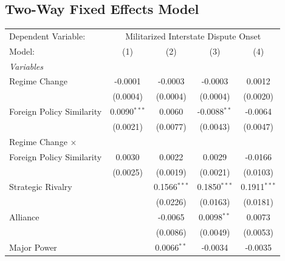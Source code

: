 \documentclass[12pt,a4paper]{article}
\begin{document}
\subsection{Two-Way Fixed Effects Model}
\begin{table}[hptb]
    \centering
\begin{tabular}{lcccc}
   \tabularnewline \midrule \midrule
   Dependent Variable: & \multicolumn{4}{c}{Militarized Interstate Dispute Onset}\\
   Model:                                & (1)            & (2)                     & (3)                            & (4)\\  
   \midrule
   \emph{Variables}\\
   Regime Change                           & -0.0001        & -0.0003                 & -0.0003                        & 0.0012\\   
                                         & (0.0004)       & (0.0004)                & (0.0004)                       & (0.0020)\\   
   Foreign Policy Similarity                               & 0.0090$^{***}$ & 0.0060                  & -0.0088$^{**}$                 & -0.0064\\   
                                         & (0.0021)       & (0.0077)                & (0.0043)                       & (0.0047)\\   
   Regime Change $\times$ \\Foreign Policy Similarity          & 0.0030         & 0.0022                  & 0.0029                         & -0.0166\\   
                                         & (0.0025)       & (0.0019)                & (0.0021)                       & (0.0103)\\   
   Strategic Rivalry                        &                & 0.1566$^{***}$          & 0.1850$^{***}$                 & 0.1911$^{***}$\\   
                                         &                & (0.0226)                & (0.0163)                       & (0.0181)\\   
   Alliance                              &                & -0.0065                 & 0.0098$^{**}$                  & 0.0073\\   
                                         &                & (0.0086)                & (0.0049)                       & (0.0053)\\   
   Major Power                                 &                & 0.0066$^{**}$           & -0.0034                        & -0.0035\\   

\end{tabular}
\end{table}
\end{document}
